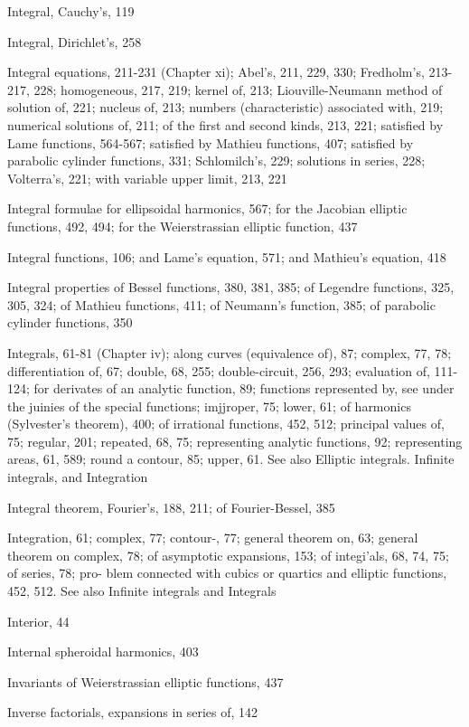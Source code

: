 Integral, Cauchy's, 119

Integral, Dirichlet's, 258

Integral equations, 211-231 (Chapter xi); Abel's, 211, 229, 330; Fredholm's, 213-217, 228;
homogeneous, 217, 219; kernel of, 213; Liouville-Neumann method of solution of, 221;
nucleus of, 213; numbers (characteristic) associated with, 219; numerical solutions of, 211;
of the first and second kinds, 213, 221; satisfied by Lame functions, 564-567; satisfied by
Mathieu functions, 407; satisfied by parabolic cylinder functions, 331; Schlomilch's, 229;
solutions in series, 228; Volterra's, 221; with variable upper limit, 213, 221

Integral formulae for ellipsoidal harmonics, 567; for the Jacobian elliptic functions, 492, 494;
for the Weierstrassian elliptic function, 437

Integral functions, 106; and Lame's equation, 571; and Mathieu's equation, 418

Integral properties of Bessel functions, 380, 381, 385; of Legendre functions, 325, 305, 324; of
Mathieu functions, 411; of Neumann's function, 385; of parabolic cylinder functions, 350

Integrals, 61-81 (Chapter iv); along curves (equivalence of), 87; complex, 77, 78; differentiation
of, 67; double, 68, 255; double-circuit, 256, 293; evaluation of, 111-124; for derivates of an
analytic function, 89; functions represented by, see under the juinies of the special functions;
imjjroper, 75; lower, 61; of harmonics (Sylvester's theorem), 400; of irrational functions,
452, 512; principal values of, 75; regular, 201; repeated,
68, 75; representing analytic functions, 92; representing areas, 61, 589; round a contour,
85; upper, 61. See also Elliptic integrals. Infinite integrals, and Integration

Integral theorem, Fourier's, 188, 211; of Fourier-Bessel, 385

Integration, 61; complex, 77; contour-, 77; general theorem on, 63; general theorem on
complex, 78; of asymptotic expansions, 153; of integi'als, 68, 74, 75; of series, 78; pro-
blem connected with cubics or quartics and elliptic functions, 452, 512. See also Infinite
integrals and Integrals

Interior, 44

Internal spheroidal harmonics, 403

Invariants of Weierstrassian elliptic functions, 437

Inverse factorials, expansions in series of, 142

